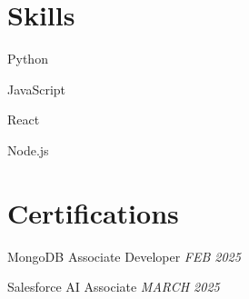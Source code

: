 \documentclass[a4paper,10pt]{article}
\begin{document}

\section*{Skills}
\noindent
\begin{compactitem}
    
        \item Python
    
        \item JavaScript
    
        \item React
    
        \item Node.js
    
\end{compactitem}



\section*{Certifications}
\noindent
\begin{compactitem}
    
        \item MongoDB Associate Developer \hfill \textit{ FEB 2025 }
    
        \item Salesforce AI Associate \hfill \textit{ MARCH 2025 }
    
\end{compactitem}
\end{document}
